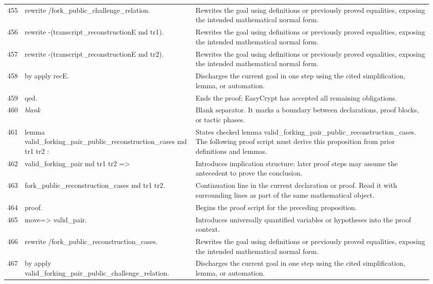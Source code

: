 \documentclass[10pt]{article}
\begin{document}
\begin{longtable}{r L{0.53\textwidth} L{0.37\textwidth}}
455 & {\ttfamily\scriptsize rewrite /fork\_public\_challenge\_relation.} & Rewrites the goal using definitions or previously proved equalities, exposing the intended mathematical normal form. \\
456 & {\ttfamily\scriptsize rewrite -(transcript\_reconstructionE md tr1).} & Rewrites the goal using definitions or previously proved equalities, exposing the intended mathematical normal form. \\
457 & {\ttfamily\scriptsize rewrite -(transcript\_reconstructionE md tr2).} & Rewrites the goal using definitions or previously proved equalities, exposing the intended mathematical normal form. \\
458 & {\ttfamily\scriptsize by apply recE.} & Discharges the current goal in one step using the cited simplification, lemma, or automation. \\
459 & {\ttfamily\scriptsize qed.} & Ends the proof; EasyCrypt has accepted all remaining obligations. \\
460 & {\ttfamily\scriptsize \emph{blank}} & Blank separator.  It marks a boundary between declarations, proof blocks, or tactic phases. \\
461 & {\ttfamily\scriptsize lemma valid\_forking\_pair\_public\_reconstruction\_cases md tr1 tr2 :} & States checked lemma valid\_forking\_pair\_public\_reconstruction\_cases.  The following proof script must derive this proposition from prior definitions and lemmas. \\
462 & {\ttfamily\scriptsize   valid\_forking\_pair md tr1 tr2 =>} & Introduces implication structure: later proof steps may assume the antecedent to prove the conclusion. \\
463 & {\ttfamily\scriptsize   fork\_public\_reconstruction\_cases md tr1 tr2.} & Continuation line in the current declaration or proof.  Read it with surrounding lines as part of the same mathematical object. \\
464 & {\ttfamily\scriptsize proof.} & Begins the proof script for the preceding proposition. \\
465 & {\ttfamily\scriptsize move=> valid\_pair.} & Introduces universally quantified variables or hypotheses into the proof context. \\
466 & {\ttfamily\scriptsize rewrite /fork\_public\_reconstruction\_cases.} & Rewrites the goal using definitions or previously proved equalities, exposing the intended mathematical normal form. \\
467 & {\ttfamily\scriptsize by apply valid\_forking\_pair\_public\_challenge\_relation.} & Discharges the current goal in one step using the cited simplification, lemma, or automation. \\

\end{longtable}
\end{document}
